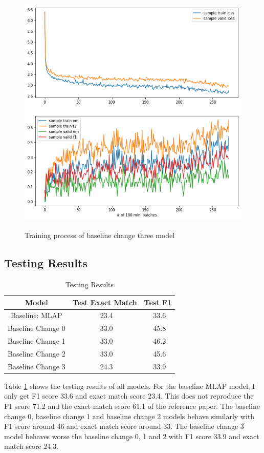 \documentclass[modernstyle,12pt]{sjsuthesis}
\theoremstyle{definition}
\begin{document}
\begin{figure}[htbp]\centering
  \includegraphics[width=12cm, height=12cm]{figures/match_change3.png}
  \caption{Training process of baseline change three model}
  \label{f:baseline_change3}
\end{figure}

\subsection{Testing Results}

\begin{table}[htbp]\centering
  \caption{Testing Results}
  \label{tab:test_results}
  \begin{tabular}{|c|c|c|}
    \hline
    Model& Test Exact Match & Test F1 \\
    \hline\hline
    Baseline: MLAP & \ 23.4 &\ 33.6 \\
    Baseline Change 0& \ 33.0 &\ 45.8 \\
    Baseline Change 1 & \ 33.0 &\ 46.2 \\
    Baseline Change 2 & \ 33.0 &\ 45.6 \\
    Baseline Change 3 & \ 24.3 &\ 33.9 \\
    \hline
  \end{tabular}
\end{table}

Table \ref{tab:test_results} shows the testing results of all models. For the baseline MLAP model, I only get F1 score 33.6 and exact match score 23.4. This does not reproduce the F1 score 71.2 and the exact match score 61.1 of the reference paper\cite{wang2016machine}. The baseline change 0, baseline change 1 and baseline change 2 models behave similarly with F1 score around 46 and exact match score around 33. The baseline change 3 model behaves worse the baseline change 0, 1 and 2 with F1 score 33.9 and exact match score 24.3.
\end{document}
